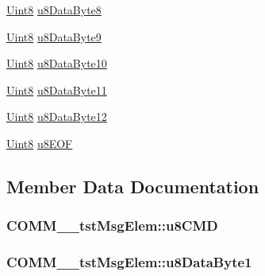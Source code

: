 \begin{DoxyCompactItemize}
\item 
\hyperlink{_d_s_p2833x___device_8h_af84840501dec18061d18a68c162a8fa2}{Uint8} \hyperlink{struct_c_o_m_m____tst_msg_elem_aa391668bc6868d912785116c688d3021}{u8\+Data\+Byte8}
\item 
\hyperlink{_d_s_p2833x___device_8h_af84840501dec18061d18a68c162a8fa2}{Uint8} \hyperlink{struct_c_o_m_m____tst_msg_elem_a5287dcc32687795d6e1a6a2157ab6c27}{u8\+Data\+Byte9}
\item 
\hyperlink{_d_s_p2833x___device_8h_af84840501dec18061d18a68c162a8fa2}{Uint8} \hyperlink{struct_c_o_m_m____tst_msg_elem_a0df236ec15eeedd3b0a5db0b88ff0058}{u8\+Data\+Byte10}
\item 
\hyperlink{_d_s_p2833x___device_8h_af84840501dec18061d18a68c162a8fa2}{Uint8} \hyperlink{struct_c_o_m_m____tst_msg_elem_a8731b4434a00fc02b348fc43515ddf60}{u8\+Data\+Byte11}
\item 
\hyperlink{_d_s_p2833x___device_8h_af84840501dec18061d18a68c162a8fa2}{Uint8} \hyperlink{struct_c_o_m_m____tst_msg_elem_a2ad6e554c03ccdf4cb4ac24dfc3b635e}{u8\+Data\+Byte12}
\item 
\hyperlink{_d_s_p2833x___device_8h_af84840501dec18061d18a68c162a8fa2}{Uint8} \hyperlink{struct_c_o_m_m____tst_msg_elem_a2164a12ad73bf87cc70c7fa3fd605f2d}{u8\+E\+O\+F}
\end{DoxyCompactItemize}


\subsection{Member Data Documentation}
\hypertarget{struct_c_o_m_m____tst_msg_elem_a741aac1823e232f3e5c764eb2ecb87b9}{}
\subsubsection[{u8\+C\+M\+D}]{ C\+O\+M\+M\+\_\+\+\_\+tst\+Msg\+Elem\+::u8\+C\+M\+D}\label{struct_c_o_m_m____tst_msg_elem_a741aac1823e232f3e5c764eb2ecb87b9}
\hypertarget{struct_c_o_m_m____tst_msg_elem_ae4263ed341e8244621fd9272d967cb9f}{}
\subsubsection[{u8\+Data\+Byte1}]{ C\+O\+M\+M\+\_\+\+\_\+tst\+Msg\+Elem\+::u8\+Data\+Byte1}\label{struct_c_o_m_m____tst_msg_elem_ae4263ed341e8244621fd9272d967cb9f}
\hypertarget{struct_c_o_m_m____tst_msg_elem_a0df236ec15eeedd3b0a5db0b88ff0058}{}
